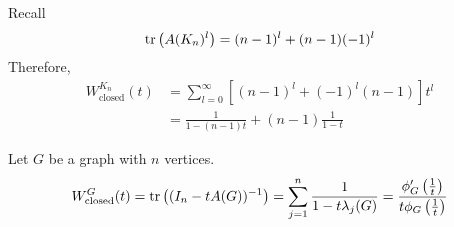 \begin{example}
Recall 
\[ \operatorname*{\mathrm{tr}}\left({A(K_n)^l}\right)=(n-1)^l+(n-1)(-1)^l \]
Therefore,
\begin{align*}
W_\text{closed}^{K_n}(t)&=\sum_{l=0}^\infty\left[(n-1)^l+(-1)^l(n-1)\right]t^l\\
&=\frac{1}{1-(n-1)t}+(n-1)\frac{1}{1-t}
\end{align*}
\end{example}

\begin{theorem}
Let \(G\) be a graph with \(n\) vertices.
\[ W_\text{closed}^G(t)=\operatorname*{\mathrm{tr}}\left((I_n-tA(G))^{-1}\right)=\sum_{j=1}^n\frac{1}{1-t\lambda_j(G)}=\frac{\phi'_G\left(\frac{1}{t}\right)}{t\phi_G\left(\frac{1}{t}\right)} \]
\end{theorem}